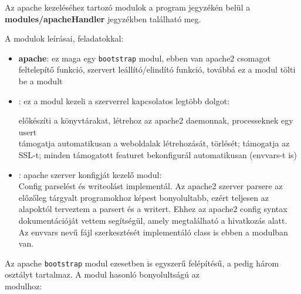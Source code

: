 
Az apache kezeléséhez tartozó modulok a program jegyzékén belül a \textbf{modules/apacheHandler} jegyzékben található meg.

A modulok leírásai, feladatokkal:
\begin{itemize}
	\item \textbf{apache}: ez maga egy \texttt{bootstrap} modul, ebben van apache2 csomagot feltelepítő funkció, szervert leállító/elindító funkció, továbbá ez a modul tölti be a \texttt{} modult
	\item \textbf{}: ez a modul kezeli a szerverrel kapcsolatos legtöbb dolgot:
	
	előkészíti a könyvtárakat, létrehoz az apache2 daemonnak, processeknek egy usert\\támogatja automatikusan a weboldalak létrehozását, törlését; támogatja az SSL-t; minden támogatott featuret bekonfigurál automatikusan (envvars-t is)

	\item \textbf{}: apache szerver konfigját kezelő modul:\\Config parselést és writeolást implementál. Az apache2 szerver parsere az előzőleg tárgyalt programokhoz képest bonyolultabb, ezért teljesen az alapoktól terveztem a parsert és a writert. Ehhez az apache2 config syntax dokumentációját vettem segítségül, amely megtalálható a \cite{apache_configuring} hivatkozás alatt.
	\\Az envvars nevű fájl szerkesztését implementáló class is ebben a modulban van.
\end{itemize}

\pagebreak

Az apache \texttt{bootstrap} modul ezesetben is egyszerű felépítésű, a \texttt{} pedig három osztályt tartalmaz. A \texttt{} modul hasonló bonyolultságú az \\\texttt{} modulhoz:
	
\hfill
	
